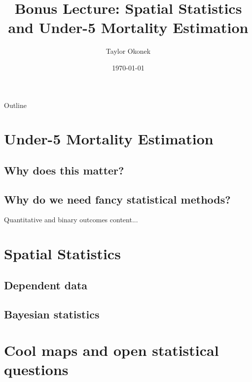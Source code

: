 \documentclass[10pt,t]{beamer}
\title{Bonus Lecture: Spatial Statistics and Under-5 Mortality Estimation}
\author{Taylor Okonek}
\date{\today}
\begin{document}
\begin{frame}
	\titlepage 
\end{frame}


\begin{frame}{Outline}
	\tableofcontents
\end{frame}



\section{Under-5 Mortality Estimation}

\subsection{Why does this matter?}

\subsection{Why do we need fancy statistical methods?}

\begin{frame}{Quantitative and binary outcomes}
content...
\end{frame}

\section{Spatial Statistics}

\subsection{Dependent data}

\subsection{Bayesian statistics}

\section{Cool maps and open statistical questions}
\end{document}
